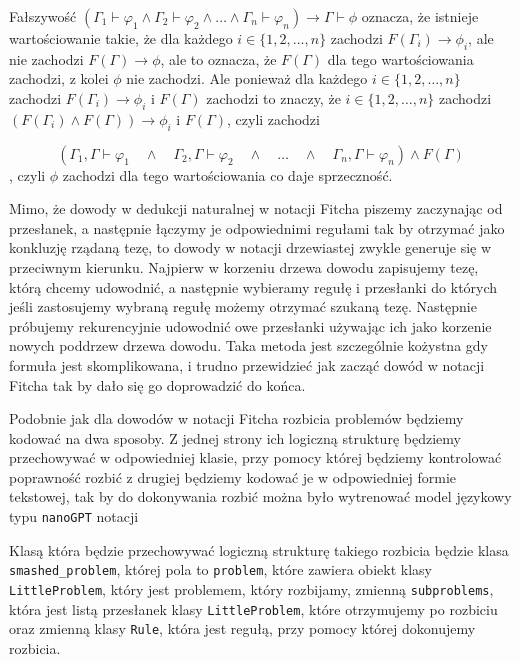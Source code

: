 \documentclass{article}
\begin{document}
\begin{center}
\begin{tcolorbox}[
    colback=gray!5,
    colframe=black,
    fonttitle=\bfseries,
    title=Obserwacja 1
]
Fałszywość $(\Gamma_1 \vdash \varphi_1 \land  \Gamma_2 \vdash \varphi_2  \land  \dots \land \Gamma_n \vdash \varphi_n ) \rightarrow \Gamma \vdash \phi$ oznacza, że istnieje wartościowanie takie, że dla każdego $i \in \{1,2,\dots,n\}$ zachodzi $F(\Gamma_i) \rightarrow \phi_i$, ale nie zachodzi $F(\Gamma) \rightarrow \phi$, ale to oznacza, że $F(\Gamma)$ dla tego wartościowania zachodzi, z kolei $\phi$ nie zachodzi. Ale ponieważ dla każdego $i \in \{1,2,\dots,n\}$ zachodzi $F(\Gamma_i) \rightarrow \phi_i$ i $F(\Gamma)$ zachodzi to znaczy, że $i \in \{1,2,\dots,n\}$ zachodzi $(F(\Gamma_i) \land F(\Gamma)) \rightarrow \phi_i$ i $F(\Gamma)$, czyli zachodzi 

\[
(\Gamma_1, \Gamma \vdash \varphi_1 \quad \land \quad \Gamma_2, \Gamma \vdash \varphi_2 \quad \land \quad \dots \quad \land  \quad\Gamma_n, \Gamma \vdash \varphi_n ) \land F(\Gamma)
\]
, czyli $\phi$ zachodzi dla tego wartościowania co daje sprzeczność.

\end{tcolorbox}
\end{center}

Mimo, że dowody w dedukcji naturalnej w notacji Fitcha piszemy zaczynając od przesłanek, a następnie łączymy je odpowiednimi regułami tak by otrzymać jako konkluzję rządaną tezę, to dowody w notacji drzewiastej 
zwykle generuje się w przeciwnym kierunku. Najpierw w korzeniu drzewa dowodu zapisujemy tezę, którą chcemy udowodnić, a następnie wybieramy regułę i przesłanki do których jeśli zastosujemy wybraną regułę możemy
otrzymać szukaną tezę. Następnie próbujemy rekurencyjnie udowodnić owe przesłanki używając ich jako korzenie nowych poddrzew drzewa dowodu. Taka metoda jest szczególnie kożystna gdy formuła jest skomplikowana, i trudno
przewidzieć jak zacząć dowód w notacji Fitcha tak by dało się go doprowadzić do końca. 

Podobnie jak dla dowodów w notacji Fitcha rozbicia problemów będziemy kodować na dwa sposoby. Z jednej strony ich logiczną strukturę będziemy przechowywać w odpowiedniej klasie, przy pomocy której będziemy 
kontrolować poprawność rozbić z drugiej będziemy kodować je w odpowiedniej formie tekstowej, tak by do dokonywania rozbić można było wytrenować model językowy typu \texttt{nanoGPT}
notacji

Klasą która będzie przechowywać logiczną strukturę takiego rozbicia będzie klasa \texttt{smashed\_problem}, której pola to \texttt{problem}, które zawiera obiekt klasy \texttt{LittleProblem}, który jest problemem, który 
rozbijamy, zmienną \texttt{subproblems}, która jest listą przesłanek klasy \texttt{LittleProblem}, które otrzymujemy po rozbiciu oraz zmienną klasy \texttt{Rule}, która jest regułą, przy pomocy której dokonujemy 
rozbicia.
\end{document}
